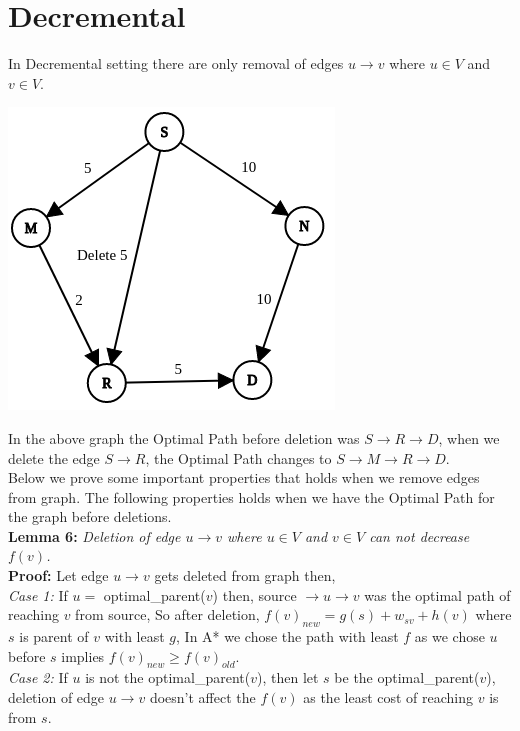 \documentclass[a4paper]{article}
\begin{document}
\section{Decremental}
In Decremental setting there are only removal of edges $u \rightarrow v$ where $u \in V$ and $v \in V$.\\
\begin{center}
\includegraphics[scale=0.4]{img/Delete2.png}    
\end{center}
In the above graph the Optimal Path before deletion was $S \rightarrow R \rightarrow D$, when we delete the edge $S \rightarrow R$, the Optimal Path changes to $S \rightarrow M \rightarrow R \rightarrow D$.\\
Below we prove some important properties that holds when we remove edges from graph. The following properties holds when we have the Optimal Path for the graph before deletions.\\
\hypertarget{Lemma 6}{\textbf{Lemma 6:}} \textit{Deletion of edge $ u \rightarrow v$ where $u \in V$ and $v \in V$ can not decrease $f(v)$.}\\
\textbf{Proof:} Let edge $ u \rightarrow v$ gets deleted from graph then,\\
\textit{Case 1:} If $u =$ optimal\_parent($v$) then, source $\rightarrow u \rightarrow v$ was the optimal path of reaching $v$ from source, So after deletion, $f(v)_{new} = g(s) + w_{sv} + h(v)$ where $s$ is parent of $v$ with least $g$, In A* we chose the path with least $f$ as we chose $u$ before $s$ implies $f(v)_{new} \geq f(v)_{old}$.\\
\textit{Case 2:} If $u$ is  not the optimal\_parent($v$), then let $s$ be the optimal\_parent($v$), deletion of edge $u \rightarrow v$ doesn't affect the $f(v)$ as the least cost of reaching $v$ is from $s$.\\
\end{document}
